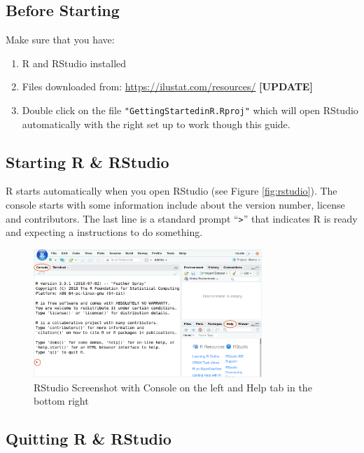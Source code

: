 \documentclass[a4paper,9pt,twocolumn,twoside,printwatermark=false]{pinp}
\providecommand{\tightlist}{%
  \setlength{\itemsep}{0pt}\setlength{\parskip}{0pt}}
\begin{document}
\subsection{Before Starting}\label{before-starting}

Make sure that you have:

\begin{enumerate}
\def\labelenumi{\arabic{enumi}.}
\tightlist
\item
  R and RStudio installed
\item
  Files downloaded from: \url{https://ilustat.com/resources/}
  \textbf{{[}UPDATE{]}}
\item
  Double click on the file \texttt{"GettingStartedinR.Rproj"} which will
  open RStudio automatically with the right set up to work though this
  guide.
\end{enumerate}

\subsection{Starting R \& RStudio}\label{starting-r-rstudio}

R starts automatically when you open RStudio (see Figure
\ref{fig:rstudio}). The console starts with some information include
about the version number, license and contributors. The last line is a
standard prompt ``\texttt{\textgreater{}}'' that indicates R is ready
and expecting a instructions to do something.

\begin{figure}[H]

{\centering \includegraphics[width=3.4in]{RStudio-Screenshot} 

}

\caption{\label{fig:rstudio}RStudio Screenshot with Console on the left and  Help tab in the bottom right}\label{fig:RStudioScreenshot}
\end{figure}

\subsection{Quitting R \& RStudio}\label{quitting-r-rstudio}
\end{document}
